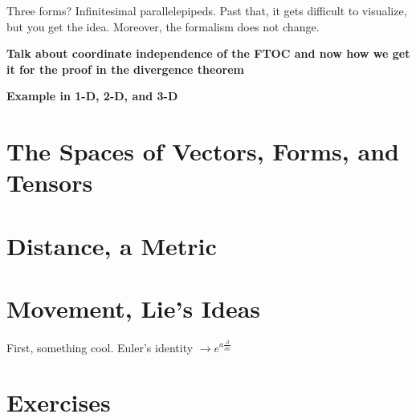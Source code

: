 	Three forms? Infinitesimal parallelepipeds. Past that, it gets difficult to visualize, but you get the idea. Moreover, the formalism does not change.

	\textbf{Talk about coordinate independence of the FTOC and now how we get it for the proof in the divergence theorem}
	
	\textbf{Example in 1-D, 2-D, and 3-D}

\section{The Spaces of Vectors, Forms, and Tensors}

\section{Distance, a Metric}

\section{Movement, Lie's Ideas}

	First, something cool. Euler's identity $\rightarrow e^{a \frac{\partial}{\partial x}}$

\section{Exercises}

